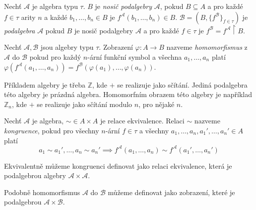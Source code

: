 \begin{definition}[Podalgebra]
    Nechť $\mathcal{A}$ je algebra typu $\tau$. $B$ je {\em nosič
    podalgebry} $\mathcal{A}$, pokud $B \subseteq A$ a pro každé
    $f \in \tau$ arity $n$ a každé $b_1,\ldots,b_n \in B$
    je $f^\mathcal{A}(b_1, \ldots, b_n) \in B$.
    $\mathcal{B} = (B, \{ f^\mathcal{B} \}_{f \in \tau})$
    je {\em podalgebra} $\mathcal{A}$ pokud $B$ je nosič
    podalgebry $\mathcal{A}$ a pro každé $f \in \tau$ je
    $f^\mathcal{B} = f^\mathcal{A} \restriction B$.
\end{definition}

\begin{definition}[Homomorfismus]
    Nechť $\mathcal{A}, \mathcal{B}$ jsou algebry typu $\tau$.
    Zobrazení $\varphi : A \to B$ nazveme {\em homomorfismus}
    z $\mathcal{A}$ do $\mathcal{B}$ pokud
    pro každý $n$-ární funkční symbol a všechna $a_1,\ldots,a_n$
    platí $\varphi(f^\mathcal{A}(a_1,\ldots,a_n)) =
    f^\mathcal{B}(\varphi(a_1),\ldots,\varphi(a_n))$.
\end{definition}

\begin{definition}
    Příkladem algebry je třeba $\mathbb{Z}$, kde $+$ se realizuje jako
    sčítání. Jediná podalgebra této algebry je prázdná algebra.
    Homomorfním obrazem této algebry je například $\mathbb{Z}_n$,
    kde $+$ se realizuje jako sčítání modulo $n$, pro
    nějaké $n$.
\end{definition}

\begin{definition}[Kongruence]
    Nechť $\mathcal{A}$ je algebra,
    ${\sim} \in A \times A$ je relace ekvivalence.
    Relaci ${\sim}$ nazveme {\em kongruence},
    pokud pro všechny $n$-ární $f \in \tau$ a všechny
    $a_1, \ldots, a_n, a_1',\ldots,a_n' \in A$
    platí
    \[
    a_1 \sim a_1',\ldots, a_n \sim a_n' \implies
    f^\mathcal{A}(a_1, \ldots, a_n) \sim
    f^\mathcal{A}(a_1', \ldots, a_n')
    \]
\end{definition}

\begin{note}
    Ekvivalentně můžeme kongruenci definovat jako relaci ekvivalence,
    která je podalgebrou algebry $\mathcal{A} \times \mathcal{A}$.

    Podobně homomorfismus $\mathcal{A}$ do $\mathcal{B}$
    můžeme definovat jako zobrazení,
    které je podalgebrou $\mathcal{A} \times \mathcal{B}$.
\end{note}


